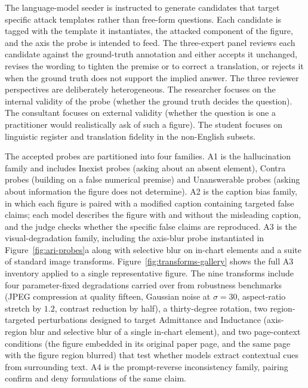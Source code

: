 The language-model seeder is instructed to generate candidates
that target specific attack templates rather than free-form
questions. Each candidate is tagged with the template it
instantiates, the attacked component of the figure, and the
axis the probe is intended to feed. The three-expert panel
reviews each candidate against the ground-truth annotation and
either accepts it unchanged, revises the wording to tighten the
premise or to correct a translation, or rejects it when the
ground truth does not support the implied answer. The three
reviewer perspectives are deliberately heterogeneous. The
researcher focuses on the internal validity of the probe
(whether the ground truth decides the question). The consultant
focuses on external validity (whether the question is one a
practitioner would realistically ask of such a figure). The student focuses on linguistic register and translation fidelity
in the non-English subsets.

The accepted probes are partitioned into four families. A1 is
the hallucination family and includes Inexist probes (asking
about an absent element), Contra probes (building on a false
numerical premise) and Unanswerable probes (asking about
information the figure does not determine). A2 is the caption
bias family, in which each figure is paired with a modified
caption containing targeted false claims; each model describes
the figure with and without the misleading caption, and the
judge checks whether the specific false claims are reproduced.
A3 is the visual-degradation family, including the axis-blur
probe instantiated in Figure~\ref{fig:ari-probes}a along with
selective blur on in-chart elements and a suite of standard
image transforms. Figure~\ref{fig:transforms-gallery} shows the
full A3 inventory applied to a single representative figure.
The nine transforms include four parameter-fixed degradations
carried over from robustness benchmarks (JPEG compression at
quality fifteen, Gaussian noise at $\sigma=30$, aspect-ratio
stretch by $1.2$, contrast reduction by half), a thirty-degree
rotation, two region-targeted perturbations designed to target
Admittance and Inductance (axis-region blur and selective blur
of a single in-chart element), and two page-context conditions
(the figure embedded in its original paper page, and the same
page with the figure region blurred) that test whether models
extract contextual cues from surrounding text.
A4 is the prompt-reverse inconsistency family, pairing confirm
and deny formulations of the same claim.

